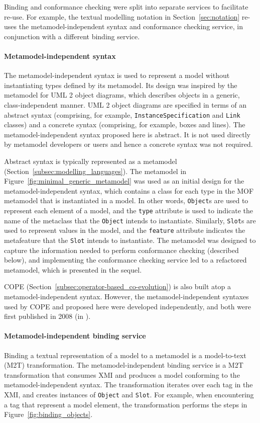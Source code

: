 Binding and conformance checking were split into separate services to facilitate re-use. For example, the textual modelling notation in Section~\ref{sec:notation} re-uses the metamodel-independent syntax and conformance checking service, in conjunction with a different binding service.

\paragraph{Metamodel-independent syntax} The metamodel-independent syntax is used to represent a model without instantiating types defined by its metamodel. Its design was inspired by the metamodel for UML 2 \cite{uml212} object diagrams, which describes objects in a generic, class-independent manner. UML 2 object diagrams are specified in terms of an abstract syntax (comprising, for example, \texttt{InstanceSpecification} and \texttt{Link} classes) and a concrete syntax (comprising, for example, boxes and lines). The metamodel-independent syntax proposed here is abstract. It is not used directly by metamodel developers or users and hence a concrete syntax was not required.

Abstract syntax is typically represented as a metamodel (Section~\ref{subsec:modelling_languages}). The metamodel in Figure~\ref{fig:minimal_generic_metamodel} was used as an initial design for the metamodel-independent syntax, which contains a class for each type in the MOF metamodel that is instantiated in a model. In other words, \texttt{Ob\-je\-ct}s are used to represent each element of a model, and the \texttt{ty\-pe} attribute is used to indicate the name of the metaclass that the \texttt{Ob\-je\-ct} intends to instantiate. Similarly, \texttt{Sl\-ot}s are used to represent values in the model, and the \texttt{feature} attribute indicates the metafeature that the \texttt{Sl\-ot} intends to instantiate. The metamodel was designed to capture the information needed to perform conformance checking (described below), and implementing the conformance checking service led to a refactored metamodel, which is presented in the sequel.

COPE (Section~\ref{subsec:operator-based_co-evolution}) is also built atop a metamodel-independent syntax. However, the metamodel-independent syntaxes used by COPE and proposed here were developed independently, and both were first published in 2008 (in \cite{rose08hutn,herrmannsdoerfer08cope}).

\paragraph{Metamodel-independent binding service} Binding a textual representation of a model to a metamodel is a model-to-text (M2T) transformation. The metamodel-independent binding service is a M2T transformation that consumes XMI and produces a model conforming to the metamodel-independent syntax. The transformation iterates over each tag in the XMI, and creates instances of \texttt{Ob\-je\-ct} and \texttt{Sl\-ot}. For example, when encountering a tag that represent a model element, the transformation performs the steps in Figure~\ref{fig:binding_objects}.

